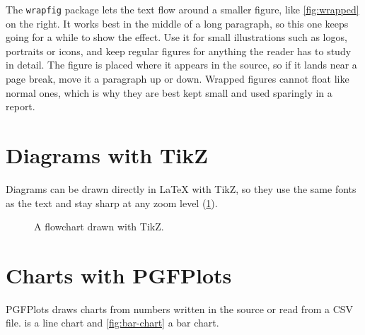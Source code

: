 The \texttt{wrapfig} package lets the text flow around a smaller figure, like
\cref{fig:wrapped} on the right. It works best in the middle of a long
paragraph, so this one keeps going for a while to show the effect. Use it
for small illustrations such as logos, portraits or icons, and keep regular
figures for anything the reader has to study in detail. The figure is placed
where it appears in the source, so if it lands near a page break, move it a
paragraph up or down. Wrapped figures cannot float like normal ones, which is
why they are best kept small and used sparingly in a report.

\section{Diagrams with TikZ}

Diagrams can be drawn directly in \LaTeX{} with TikZ, so they use the same
fonts as the text and stay sharp at any zoom level (\cref{fig:tikz}).

\begin{figure}[H]
  \centering
  \caption{A flowchart drawn with TikZ.}
  \label{fig:tikz}
\end{figure}

\section{Charts with PGFPlots}

PGFPlots draws charts from numbers written in the source or read from a CSV
file.  is a line chart and \cref{fig:bar-chart} a bar
chart.

